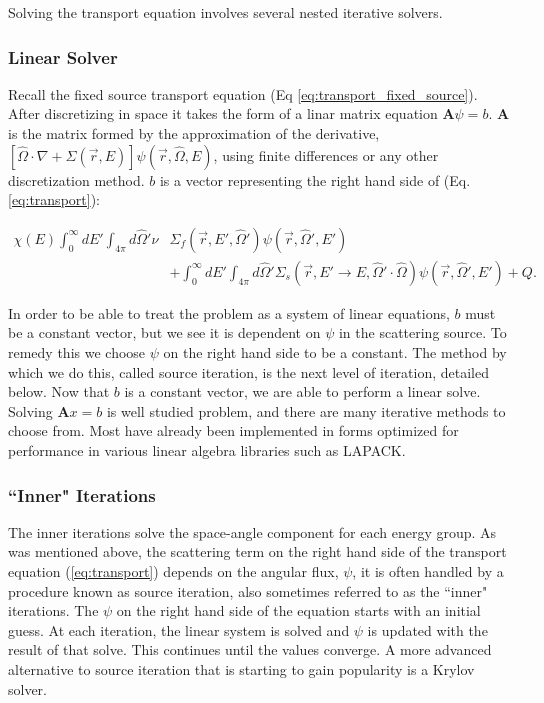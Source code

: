 
Solving the transport equation involves several nested iterative solvers. 
\subsubsection{Linear Solver}
Recall the fixed source transport equation (Eq \ref{eq:transport_fixed_source}). After discretizing in space it takes the form of a linar matrix equation $\textbf{A}\psi = b$. $\textbf{A}$ is the matrix formed by the approximation of the derivative, $[\hat{\Omega} \cdot \nabla + \Sigma(\vec{r}, E)]\psi(\vec{r}, \hat{\Omega}, E)$, using finite differences or any other discretization method. $b$ is a vector representing the right hand side of (Eq. \ref{eq:transport}): 

\begin{align}
\chi(E) \int_0^\infty dE'  \int_{4\pi} d\hat{\Omega}' \nu &\Sigma_{f}(\vec{r}, E', \hat{\Omega}')\psi(\vec{r}, \hat{\Omega}', E') \nonumber \\ &+ \int_0^\infty dE' \int_{4\pi} d\hat{\Omega}' \Sigma_s(\vec{r}, E' \rightarrow E, \hat{\Omega}' \cdot \hat{\Omega})\psi(\vec{r}, \hat{\Omega}', E')  + Q. \nonumber
\end{align}

In order to be able to treat the problem as a system of linear equations, $b$ must be a constant vector, but we see it is dependent on $\psi$ in the scattering source. To remedy this we choose $\psi$ on the right hand side to be a constant. The method by which we do this, called source iteration, is the next level of iteration, detailed below. Now that $b$ is a constant vector, we are able to perform a linear solve. Solving $\textbf{A}x = b$ is well studied problem, and there are many iterative methods to choose from. Most have already been implemented in forms optimized for performance in various linear algebra libraries such as LAPACK.

\subsubsection{``Inner" Iterations}
The inner iterations solve the space-angle component for each energy group. As was mentioned above, the scattering term on the right hand side of the transport equation (\ref{eq:transport}) depends on the angular flux, $\psi$, it is often handled by a procedure known as source iteration, also sometimes referred to as the ``inner" iterations. The $\psi$ on the right hand side of the equation starts with an initial guess. At each iteration, the linear system is solved and $\psi$ is updated with the result of that solve. This continues until the values converge. A more advanced alternative to source iteration that is starting to gain popularity is a Krylov solver. 

